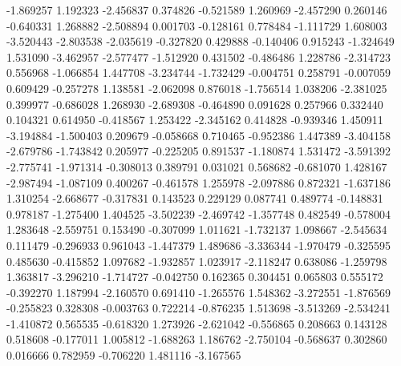 -1.869257
1.192323
-2.456837
0.374826
-0.521589
1.260969
-2.457290
0.260146
-0.640331
1.268882
-2.508894
0.001703
-0.128161
0.778484
-1.111729
1.608003
-3.520443
-2.803538
-2.035619
-0.327820
0.429888
-0.140406
0.915243
-1.324649
1.531090
-3.462957
-2.577477
-1.512920
0.431502
-0.486486
1.228786
-2.314723
0.556968
-1.066854
1.447708
-3.234744
-1.732429
-0.004751
0.258791
-0.007059
0.609429
-0.257278
1.138581
-2.062098
0.876018
-1.756514
1.038206
-2.381025
0.399977
-0.686028
1.268930
-2.689308
-0.464890
0.091628
0.257966
0.332440
0.104321
0.614950
-0.418567
1.253422
-2.345162
0.414828
-0.939346
1.450911
-3.194884
-1.500403
0.209679
-0.058668
0.710465
-0.952386
1.447389
-3.404158
-2.679786
-1.743842
0.205977
-0.225205
0.891537
-1.180874
1.531472
-3.591392
-2.775741
-1.971314
-0.308013
0.389791
0.031021
0.568682
-0.681070
1.428167
-2.987494
-1.087109
0.400267
-0.461578
1.255978
-2.097886
0.872321
-1.637186
1.310254
-2.668677
-0.317831
0.143523
0.229129
0.087741
0.489774
-0.148831
0.978187
-1.275400
1.404525
-3.502239
-2.469742
-1.357748
0.482549
-0.578004
1.283648
-2.559751
0.153490
-0.307099
1.011621
-1.732137
1.098667
-2.545634
0.111479
-0.296933
0.961043
-1.447379
1.489686
-3.336344
-1.970479
-0.325595
0.485630
-0.415852
1.097682
-1.932857
1.023917
-2.118247
0.638086
-1.259798
1.363817
-3.296210
-1.714727
-0.042750
0.162365
0.304451
0.065803
0.555172
-0.392270
1.187994
-2.160570
0.691410
-1.265576
1.548362
-3.272551
-1.876569
-0.255823
0.328308
-0.003763
0.722214
-0.876235
1.513698
-3.513269
-2.534241
-1.410872
0.565535
-0.618320
1.273926
-2.621042
-0.556865
0.208663
0.143128
0.518608
-0.177011
1.005812
-1.688263
1.186762
-2.750104
-0.568637
0.302860
0.016666
0.782959
-0.706220
1.481116
-3.167565
